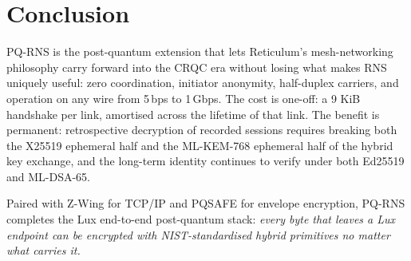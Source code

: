 \documentclass[11pt,a4paper]{article}
\begin{document}
\section{Conclusion}

PQ-RNS is the post-quantum extension that lets Reticulum's
mesh-networking philosophy carry forward into the CRQC era without
losing what makes RNS uniquely useful: zero coordination, initiator
anonymity, half-duplex carriers, and operation on any wire from 5\,bps
to 1\,Gbps. The cost is one-off: a 9 KiB handshake per link, amortised
across the lifetime of that link. The benefit is permanent:
retrospective decryption of recorded sessions requires breaking both
the X25519 ephemeral half and the ML-KEM-768 ephemeral half of the
hybrid key exchange, and the long-term identity continues to verify
under both Ed25519 and ML-DSA-65.

Paired with Z-Wing for TCP/IP and PQSAFE for envelope encryption,
PQ-RNS completes the Lux end-to-end post-quantum stack: \emph{every
byte that leaves a Lux endpoint can be encrypted with NIST-standardised
hybrid primitives no matter what carries it.}
\end{document}
